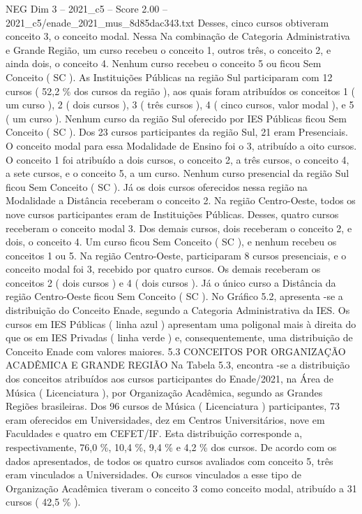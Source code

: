 \begin{textsample}{NEG Dim 3 – 2021\_c5 – Score 2.00 – 2021\_c5/enade\_2021\_mus\_8d85dac343.txt}
Desses, cinco cursos obtiveram conceito 3, o conceito modal.
Nessa Na combinação de Categoria Administrativa e Grande Região, um curso recebeu o conceito 1, outros três, o conceito 2, e ainda dois, o conceito 4.
Nenhum curso recebeu o conceito 5 ou ficou Sem Conceito ( SC ).
As Instituições Públicas na região Sul participaram com 12 cursos ( 52,2 \% dos cursos da região ), aos quais foram atribuídos os conceitos 1 ( um curso ), 2 ( dois cursos ), 3 ( três cursos ), 4 ( cinco cursos, valor modal ), e 5 ( um curso ).
Nenhum curso da região Sul oferecido por IES Públicas ficou Sem Conceito ( SC ).
Dos 23 cursos participantes da região Sul, 21 eram Presenciais.
O conceito modal para essa Modalidade de Ensino foi o 3, atribuído a oito cursos.
O conceito 1 foi atribuído a dois cursos, o conceito 2, a três cursos, o conceito 4, a sete cursos, e o conceito 5, a um curso.
Nenhum curso presencial da região Sul ficou Sem Conceito ( SC ).
Já os dois cursos oferecidos nessa região na Modalidade a Distância receberam o conceito 2.
Na região Centro-Oeste, todos os nove cursos participantes eram de Instituições Públicas.
Desses, quatro cursos receberam o conceito modal 3.
Dos demais cursos, dois receberam o conceito 2, e dois, o conceito 4.
Um curso ficou Sem Conceito ( SC ), e nenhum recebeu os conceitos 1 ou 5.
Na região Centro-Oeste, participaram 8 cursos presenciais, e o conceito modal foi 3, recebido por quatro cursos.
Os demais receberam os conceitos 2 ( dois cursos ) e 4 ( dois cursos ).
Já o único curso a Distância da região Centro-Oeste ficou Sem Conceito ( SC ).
No Gráfico 5.2, apresenta -se a distribuição do Conceito Enade, segundo a Categoria Administrativa da IES.
Os cursos em IES Públicas ( linha azul ) apresentam uma poligonal mais à direita do que os em IES Privadas ( linha verde ) e, consequentemente, uma distribuição de Conceito Enade com valores maiores. 5.3 CONCEITOS POR ORGANIZAÇÃO ACADÊMICA E GRANDE REGIÃO Na Tabela 5.3, encontra -se a distribuição dos conceitos atribuídos aos cursos participantes do Enade/2021, na Área de Música ( Licenciatura ), por Organização Acadêmica, segundo as Grandes Regiões brasileiras.
Dos 96 cursos de Música ( Licenciatura ) participantes, 73 eram oferecidos em Universidades, dez em Centros Universitários, nove em Faculdades e quatro em CEFET/IF.
Esta distribuição corresponde a, respectivamente, 76,0 \%, 10,4 \%, 9,4 \% e 4,2 \% dos cursos.
De acordo com os dados apresentados, de todos os quatro cursos avaliados com conceito 5, três eram vinculados a Universidades.
Os cursos vinculados a esse tipo de Organização Acadêmica tiveram o conceito 3 como conceito modal, atribuído a 31 cursos ( 42,5 \% ).

\end{textsample}
